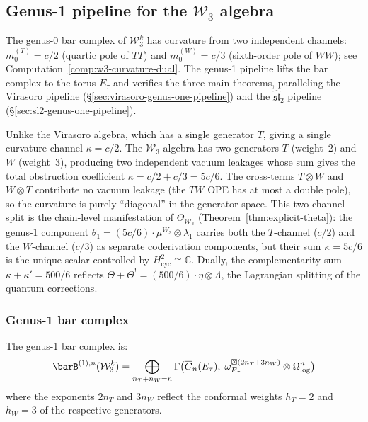 \subsection{\texorpdfstring{Genus-1 pipeline for the $\mathcal{W}_3$ algebra}{Genus-1 pipeline for the W3 algebra}}
\label{sec:w3-genus-one-pipeline}

The genus-0 bar complex of $\mathcal{W}_3^k$ has curvature from two
independent channels: $m_0^{(T)} = c/2$ (quartic pole of $TT$) and
$m_0^{(W)} = c/3$ (sixth-order pole of $WW$); see
Computation~\ref{comp:w3-curvature-dual}.  The genus-1
pipeline lifts the bar complex to the torus $E_\tau$ and
verifies the three main theorems, paralleling the Virasoro pipeline
(\S\ref{sec:virasoro-genus-one-pipeline}) and the
$\widehat{\mathfrak{sl}}_2$ pipeline (\S\ref{sec:sl2-genus-one-pipeline}).

Unlike the Virasoro algebra, which has a single generator $T$, giving a single
curvature channel $\kappa = c/2$.  The $\mathcal{W}_3$ algebra has two
generators $T$ (weight~$2$) and $W$ (weight~$3$), producing two
independent vacuum leakages whose sum gives the total obstruction
coefficient $\kappa = c/2 + c/3 = 5c/6$.  The cross-terms
$T \otimes W$ and $W \otimes T$ contribute no vacuum leakage
(the $TW$ OPE has at most a double pole), so the curvature is
purely ``diagonal'' in the generator space.
This two-channel split is the chain-level manifestation of
$\Theta_{\mathcal{W}_3}$ (Theorem~\ref{thm:explicit-theta}):
the genus-$1$ component $\theta_1 = (5c/6) \cdot \mu^{W_3}
\otimes \lambda_1$ carries both the $T$-channel ($c/2$) and the
$W$-channel ($c/3$) as separate coderivation components,
but their sum $\kappa = 5c/6$ is the unique scalar
controlled by $H^2_{\mathrm{cyc}} \cong \mathbb{C}$.
Dually, the complementarity sum $\kappa + \kappa' = 500/6$
reflects $\Theta + \Theta^! = (500/6) \cdot \eta \otimes \Lambda$,
the Lagrangian splitting of the quantum corrections.

\subsubsection{Genus-1 bar complex}

The genus-1 bar complex is:
\begin{equation}\label{eq:w3-genus1-bar}
\barB^{(1),n}(\mathcal{W}_3^k) = \bigoplus_{n_T + n_W = n}
  \Gamma\bigl(\overline{C}_n(E_\tau),\;
  \omega_{E_\tau}^{\boxtimes(2n_T + 3n_W)} \otimes \Omega^n_{\log}\bigr)
\end{equation}
where the exponents $2n_T$ and $3n_W$ reflect the conformal weights
$h_T = 2$ and $h_W = 3$ of the respective generators.

